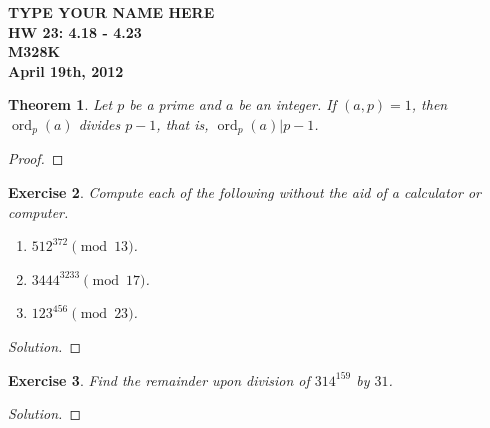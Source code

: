 \documentclass[12pt,leqno]{article}
\numberwithin{equation}{section}
\newtheorem{thm}{Theorem}[section]
\newtheorem{exer}[thm]{Exercise}
\theoremstyle{definition}
\begin{document}
\thispagestyle{plain}
\begin{flushright}
\large{\textbf{TYPE YOUR NAME HERE \\
HW 23: 4.18 - 4.23\\
M328K \\
April 19th, 2012 \\}}
\end{flushright}

\markboth{}{} \setcounter{section}{0} \baselineskip=18pt

\setcounter{tocdepth}{4}



\setcounter{section}{4}

\setcounter{thm}{17}

\begin{thm}
Let $p$ be a prime and $a$ be an integer. If $(a,p)=1$, then
$\operatorname{ord}_p(a)$ divides $p-1$, that is,
$\operatorname{ord}_p(a)| p-1$.
\end{thm}
\begin{proof}[Proof]
\end{proof}

\begin{exer}
Compute each of the following without the aid of a calculator or
computer.
\begin{enumerate}
\item $512^{372} \pmod{13}$.
\item $3444^{3233} \pmod{17}$.
\item $123^{456} \pmod{23}$.
\end{enumerate}
\end{exer}
\begin{proof}[Solution]
\end{proof}

\begin{exer}
Find the remainder upon division of $314^{159}$ by $31$.
\end{exer}
\begin{proof}[Solution]
\end{proof}
\end{document}
